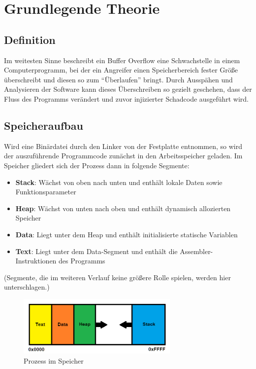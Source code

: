 \section{Grundlegende Theorie}
\subsection{Definition}
Im weitesten Sinne beschreibt ein Buffer Overflow eine Schwachstelle in einem Computerprogramm,
bei der ein Angreifer einen Speicherbereich fester Größe überschreibt und diesen so zum “Überlaufen” bringt.
Durch Ausspähen und Analysieren der Software kann dieses Überschreiben so gezielt geschehen, dass der Fluss des
Programms verändert und zuvor injizierter Schadcode ausgeführt wird. \cite{NISTSP} \cite{springer}
\subsection{Speicheraufbau}
Wird eine Binärdatei durch den Linker von der Festplatte entnommen, so wird der auszuführende Programmcode
zunächst in den Arbeitsspeicher geladen. Im Speicher gliedert sich der Prozess dann in folgende Segmente:
\begin{itemize}
    \item \textbf{Stack}: Wächst von oben nach unten und enthält lokale Daten sowie Funktionsparameter
    \item \textbf{Heap}: Wächst von unten nach oben und enthält dynamisch allozierten Speicher
    \item \textbf{Data}: Liegt unter dem Heap und enthält initialisierte statische Variablen
    \item \textbf{Text}: Liegt unter dem Data-Segment und enthält die Assembler-Instruktionen des Programms
\end{itemize}

(Segmente, die im weiteren Verlauf keine größere Rolle spielen, werden hier unterschlagen.)
\begin{figure}[h]
    \centering
    \includegraphics[width=0.7\textwidth,height=0.75\textheight,keepaspectratio]{images/process.png}
    \caption{Prozess im Speicher}
\end{figure}

